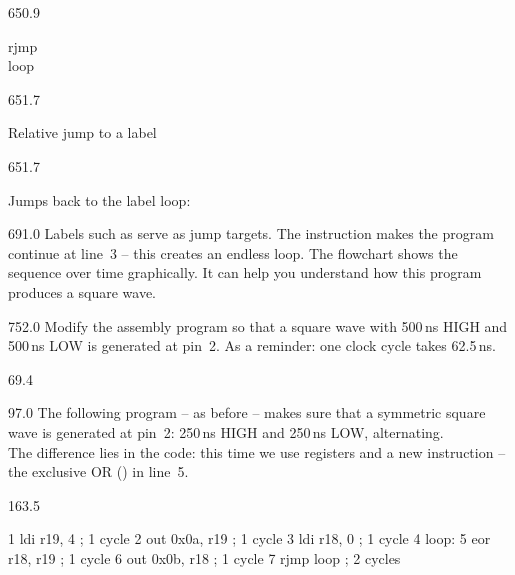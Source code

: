 \documentclass{aslab}
\makeatletter
\newcommand*\aN[1]{\textcolor{codeorange}{#1}}%
\newcommand*\aI[1]{\textcolor{codegreen}{#1}}%
\newcommand*\aK[1]{\textcolor{codered}{#1}}%
\newcommand*\aR[1]{\textcolor{codecyan}{#1}}%
\newcommand*\aC[1]{\textcolor{codepurple}{#1}}%
\newenvironment{asmlisting}{\par\ttfamily\asm@setup}{\par}
\newcommand*\cell{\small\baselineskip=12bp\raggedright}
\makeatother
\begin{document}
\begin{region}[x=61.0,width=54,free,pitch=11]{650.9}\cell\ttfamily
rjmp\\loop
\end{region}
\begin{region}[x=122.3,width=139,free]{651.7}\cell Relative jump to a label\end{region}
\begin{region}[x=269.5,width=265,free]{651.7}\cell
Jumps back to the label {\ttfamily loop:}
\end{region}

\begin{region}{691.0}
Labels such as  serve as jump targets. The instruction
 makes the program continue at line~3 -- this creates an
endless loop. The flowchart shows the sequence over time graphically. It can
help you understand how this program produces a square wave.
\end{region}

\begin{region}{752.0}
Modify the assembly program so that a square wave with 500\,ns HIGH and
500\,ns LOW is generated at pin~2. As a reminder: one clock cycle takes
62.5\,ns.
\end{region}

\nextpage
\begin{region}{69.4}
\end{region}

\begin{region}[pitch=13.27]{97.0}
The following program -- as before -- makes sure that a symmetric square
wave is generated at pin~2: 250\,ns HIGH and 250\,ns LOW, alternating.\\
The difference lies in the code: this time we use registers and a new
instruction -- the exclusive OR () in line~5.
\end{region}

\begin{region}{163.5}
\begin{asmlisting}
  \aN{1}         \aI{ldi}     \aR{r19},    \aK{4}           \aC{; 1 cycle}
  \aN{2}         \aI{out}     \aK{0x0a},   \aR{r19}         \aC{; 1 cycle}
  \aN{3}         \aI{ldi}     \aR{r18},    \aK{0}           \aC{; 1 cycle}
  \aN{4 loop}:
  \aN{5}         \aI{eor}     \aR{r18},    \aR{r19}         \aC{; 1 cycle}
  \aN{6}         \aI{out}     \aK{0x0b},   \aR{r18}         \aC{; 1 cycle}
  \aN{7}         \aI{rjmp}    \aR{loop}                \aC{; 2 cycles}
\end{asmlisting}
\end{region}
\end{document}

